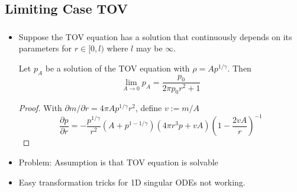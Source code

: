 \subsection{Limiting Case TOV}
\begin{frame}
	\frametitle{\insertsubsection}
	\begin{itemize}[<+->]
		\item Suppose the TOV equation has a solution that continuously depends on its parameters for $r\in[0,l)$ where $l$ may be $\infty$.
		\begin{theorem}
			Let $p_A$ be a solution of the TOV equation with $\rho=Ap^{1/\gamma}$. Then 
			\begin{equation}
				\lim_{A\rightarrow0}p_A=\frac{p_0}{2\pi p_0r^2+1}
			\end{equation}
		\end{theorem}
		\begin{proof}
			With $\partial m/\partial r = 4\pi Ap^{1/\gamma}r^2$, define $v:=m/A$
			\begin{equation}
				\frac{\partial p}{\partial r} = -\frac{p^{1/\gamma}}{r^2}\left(A+p^{1-1/\gamma}\right)\left(4\pi r^3p+vA\right)\left(1-\frac{2vA}{r}\right)^{-1}
			\end{equation}
		\end{proof}
	\end{itemize}
\end{frame}

\begin{frame}
	\begin{itemize}[<+->]
		\begin{proofcont}
			Then for $A=0$, we have
			\begin{equation}
				\frac{\partial p}{\partial r} = -4\pi rp^2
			\end{equation}
			The solution to this differential equation is $p=\frac{p_0}{2\pi p_0r^2+1}$.
		\end{proofcont}
		\item Problem: Assumption is that TOV equation is solvable
		\item Easy transformation tricks for 1D singular ODEs not working.
	\end{itemize}
\end{frame}


